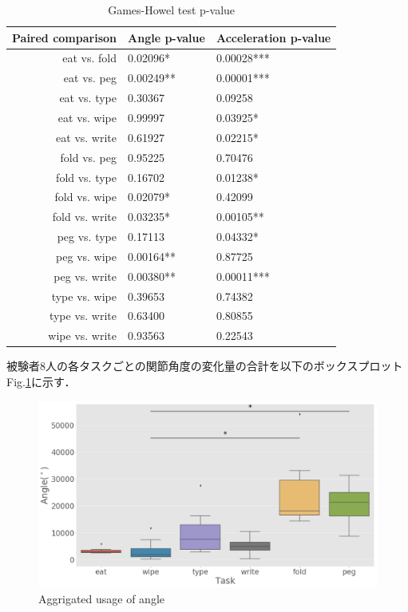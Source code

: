 \begin{table}[H]
  \caption{Games-Howel test p-value}
  \label{table:games}
  \centering
  \begin{tabular}{rll}
    \hline 
Paired comparison &  Angle p-value  & Acceleration p-value\\
    \hline \hline
eat vs. fold     & 0.02096*&0.00028***\\
eat vs. peg      & 0.00249**&0.00001***\\
eat vs. type     & 0.30367&0.09258\\
eat vs. wipe     & 0.99997&0.03925*\\
eat vs. write    & 0.61927&0.02215*\\
fold vs. peg     & 0.95225&0.70476\\
fold vs. type    & 0.16702&0.01238*\\
fold vs. wipe    & 0.02079*&0.42099\\
fold vs. write   & 0.03235*&0.00105**\\
peg vs. type     & 0.17113&0.04332*\\
peg vs. wipe     & 0.00164**&0.87725\\
peg vs. write    & 0.00380**&0.00011***\\
type vs. wipe    & 0.39653&0.74382\\
type vs. write   & 0.63400&0.80855\\
wipe vs. write   & 0.93563&0.22543\\
    \hline
  \end{tabular}
\end{table}


被験者8人の各タスクごとの関節角度の変化量の合計を以下のボックスプロットFig.\ref{fig:angle_usage}に示す．


\begin{figure}[H]
  \centering
  \includegraphics[width=0.8\linewidth]{fig/boxplot_angle}
  \caption{Aggrigated usage of angle}
  \label{fig:angle_usage}
\end{figure}


